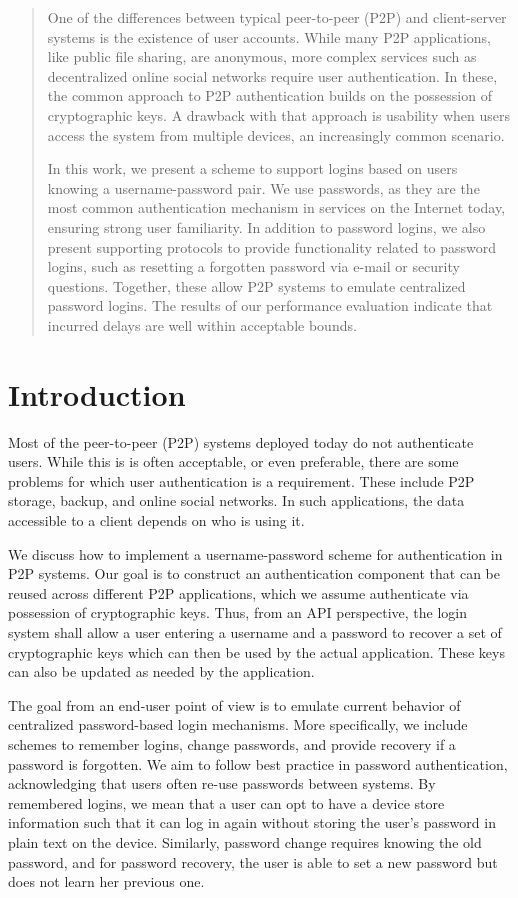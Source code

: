 \begin{abstract}
One of the differences between typical peer-to-peer (P2P) and client-server
systems is the existence of user accounts. While many P2P applications, like
public file sharing, are anonymous, more complex services such as
decentralized online social networks require user authentication. In these,
the common approach to P2P authentication builds on the possession of
cryptographic keys. A drawback with that approach is usability when users
access the system from multiple devices, an increasingly common scenario.

In this work, we present a scheme to support logins based on users knowing a
username-password pair. We use passwords, as they are the most common
authentication mechanism in services on the Internet today, ensuring strong
user familiarity. In addition to password logins, we also present supporting
protocols to provide functionality related to password logins, such as
resetting a forgotten password via e-mail or security questions. Together,
these allow P2P systems to emulate centralized password logins. The
results of our performance evaluation  indicate that incurred delays
are well within acceptable bounds.
\end{abstract}

\clearpage
\section{Introduction}

Most of the peer-to-peer (P2P) systems deployed today do not authenticate
users. While this is is often acceptable, or even preferable, there are some
problems for which user authentication is a requirement. These include P2P
storage, backup, and online social networks. In such applications, the data
accessible to a client depends on who is using it.

We discuss how to implement a username-password scheme for  authentication
in P2P systems. Our goal is to construct an authentication
component that can be reused across different P2P applications, which we assume 
authenticate via possession of cryptographic keys. Thus, from an API 
perspective, the login system shall allow a user entering a username and a password
to recover a set of cryptographic keys which can then be used by the actual
application. These keys can also be updated as needed
by the application.

The goal from an end-user point of view is to emulate current behavior 
of centralized password-based login mechanisms. More specifically,
we include schemes to remember logins, change passwords, and provide
recovery if a password is forgotten.  We aim to follow best practice in
password authentication, acknowledging that users often re-use passwords
between systems. By remembered logins, we mean that a user can opt to have
a device store information such that it can log in again without storing the
user's password in plain text on the device. 
Similarly, password change requires knowing the old password, and for
password recovery, the user is able to set a new password but does not learn
her previous one.

